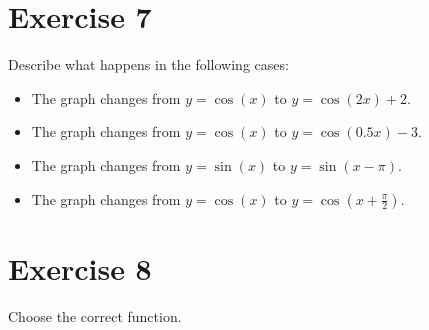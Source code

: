 \documentclass[11pt,a4paper]{article}
\begin{document}
\section*{Exercise 7}
Describe what happens in the following cases:
\begin{itemize}
\item The graph changes from $y=\cos(x)$ to $y=\cos(2x)+2$.
\item The graph changes from $y=\cos(x)$ to $y=\cos(0.5x)-3$.
\item The graph changes from $y=\sin(x)$ to $y=\sin(x-\pi)$.
\item The graph changes from $y=\cos(x)$ to $y=\cos\left(x+\frac{\pi}{2}\right)$.
\end{itemize}

\section*{Exercise 8}
Choose the correct function.
\end{document}
